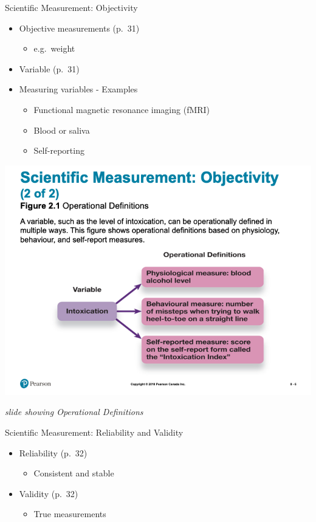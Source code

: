 \documentclass[
]{book}
\providecommand{\tightlist}{%
  \setlength{\itemsep}{0pt}\setlength{\parskip}{0pt}}
\begin{document}
Scientific Measurement: Objectivity

\begin{itemize}
\tightlist
\item
  Objective measurements (p.~31)

  \begin{itemize}
  \tightlist
  \item
    e.g.~weight\\
  \end{itemize}
\item
  Variable (p.~31)\\
\item
  Measuring variables - Examples

  \begin{itemize}
  \tightlist
  \item
    Functional magnetic resonance imaging (fMRI)\\
  \item
    Blood or saliva\\
  \item
    Self-reporting
  \end{itemize}
\end{itemize}

\includegraphics{assets/unit_1/PSYC106-Chs2-ResearchandThoughtandLanguage-3rdEd.png}

\emph{slide showing Operational Definitions}

Scientific Measurement: Reliability and Validity

\begin{itemize}
\tightlist
\item
  Reliability (p.~32)

  \begin{itemize}
  \tightlist
  \item
    Consistent and stable\\
  \end{itemize}
\item
  Validity (p.~32)

  \begin{itemize}
  \tightlist
  \item
    True measurements
  \end{itemize}
\end{itemize}
\end{document}
